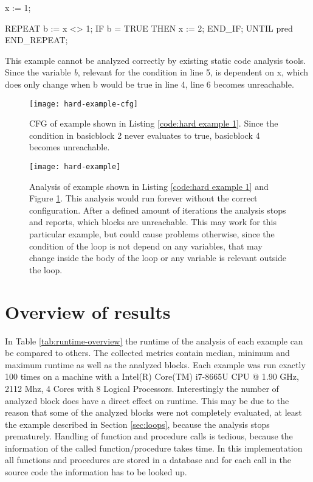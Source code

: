 \begin{program}[h!]
	\begin{GenericCode}
x := 1;
	
REPEAT
	b := x <> 1;
	IF b = TRUE THEN
		x := 2;
	END_IF;    
UNTIL pred
END_REPEAT;	\end{GenericCode}
	\centering
	\caption{This example cannot be analyzed correctly by existing static code analysis tools. Since the variable \emph{b}, relevant for the condition in line 5, is dependent on x, which does only change when b would be true in line 4, line 6 becomes unreachable. }
	\label{code:hard example 1}	
\end{program}

\begin{figure}[hbt!]
	\centering
	\texttt{[image: hard-example-cfg]}
	\caption{CFG of example shown in Listing \ref{code:hard example 1}. Since the condition in basicblock 2 never evaluates to true, basicblock 4 becomes unreachable.}
	\label{fig:hard example 1}
\end{figure}
\begin{figure}[hbt!]
	\centering
	\texttt{[image: hard-example]}
	\caption{Analysis of example shown in Listing \ref{code:hard example 1} and Figure \ref{fig:hard example 1}. This analysis would run forever without the correct configuration. After a defined amount of iterations the analysis stops and reports, which blocks are unreachable. This may work for this particular example, but could cause problems otherwise, since the condition of the loop is not depend on any variables, that may change inside the body of the loop or any variable is relevant outside the loop.}
	\label{fig:hard example 1 cfg}
\end{figure}

\section{Overview of results}
\label{sec:overview of results}
In Table \ref{tab:runtime-overview} the runtime of the analysis of each example can be compared to others. The collected metrics contain median, minimum and maximum runtime as well as the analyzed blocks. 
Each example was run exactly 100 times on a machine with a Intel(R) Core(TM) i7-8665U CPU @ 1.90 GHz, 2112 Mhz, 4 Cores with 8 Logical Processors. 
Interestingly the number of analyzed block does have a direct effect on runtime. This may be due to the reason that some of the analyzed blocks were not completely evaluated, at least the example described in Section \ref{sec:loops}, because the analysis stops prematurely. Handling of function and procedure calls is tedious, because the information of the called function/procedure takes time. In this implementation all functions and procedures are stored in a database and for each call in the source code the information has to be looked up.

